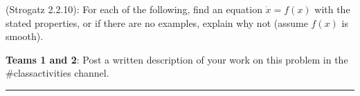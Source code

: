 \documentclass[12pt,letterpaper,noanswers]{exam}
\begin{document}
\begin{questions}




\question 

(Strogatz 2.2.10): For each of the following, find an equation $\dot{x} = f(x)$ with the
stated properties, or if there are no examples, explain why not (assume $f(x)$ is smooth).

\noindent \textbf{Teams 1 and 2}: Post a written description of your work on this problem in the \#classactivities channel. 

\end{questions}


\hrule
\vspace{0.2cm}

\eject
\end{document}
